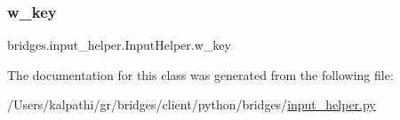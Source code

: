 \mbox{\label{classbridges_1_1input__helper_1_1_input_helper_a5805e22dfd0bda43e27aacb3bc638df3}} 
\subsubsection{\texorpdfstring{w\+\_\+key}{w\_key}}
{\footnotesize\ttfamily bridges.\+input\+\_\+helper.\+Input\+Helper.\+w\+\_\+key}



The documentation for this class was generated from the following file\+:\begin{DoxyCompactItemize}
\item 
/\+Users/kalpathi/gr/bridges/client/python/bridges/\mbox{\hyperlink{input__helper_8py}{input\+\_\+helper.\+py}}\end{DoxyCompactItemize}
